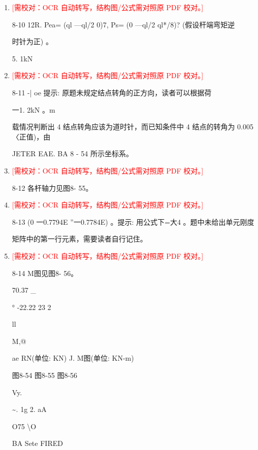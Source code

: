 \documentclass[UTF8,12pt,a4paper,openany]{ctexbook}
\newcommand{\TODO}[1]{\textcolor{red}{[需校对：#1]}}
\begin{document}
\begin{enumerate}[label=\textbf{\arabic*.},leftmargin=2em]
\item \TODO{OCR 自动转写，结构图/公式需对照原 PDF 校对。}\par 8-10 12R. Pea= (ql —ql/2 0)7, Ps= (0 —ql/2 ql*/8)? (假设杆端弯矩逆\par 时针为正) 。\par 5. 1kN
\item \TODO{OCR 自动转写，结构图/公式需对照原 PDF 校对。}\par 8-11  -| oe 提示: 原题未规定结点转角的正方向，读者可以根据荷\par 一1. 2kN 。m\par 载情况判断出 4 结点转角应该为道时针，而已知条件中 4 结点的转角为 0.005 〈正值)，由\par JETER EAE. BA 8 - 54 所示坐标系。
\item \TODO{OCR 自动转写，结构图/公式需对照原 PDF 校对。}\par 8-12 各杆轴力见图8- 55。
\item \TODO{OCR 自动转写，结构图/公式需对照原 PDF 校对。}\par 8-13 (0 一0.7794E ”一0.7784E) 。提示: 用公式下=大4 。题中未给出单元刚度\par 矩阵中的第一行元素，需要读者自行记住。
\item \TODO{OCR 自动转写，结构图/公式需对照原 PDF 校对。}\par 8-14 M图见图8- 56。\par 70.37       \_\par ° -22.22                  23             2\par ll\par M,@\par ae           RN(单位: KN)                      J.          M图(单位: KN-m)\par 图8-54        图8-55                      图8-56\par Vy.\par \textasciitilde{}. 1g 2. aA\par O75 \textbackslash{}O\par BA Sete FIRED
\end{enumerate}
\backmatter
\end{document}
